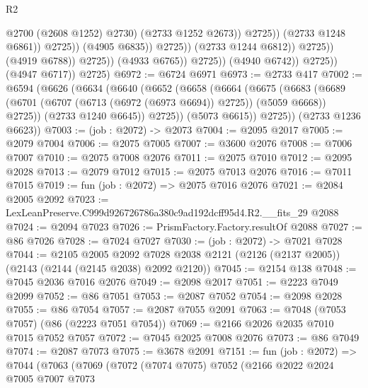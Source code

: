 \begin{lexlean}{R2}
\begin{coremodule}
                                                    @2700
                                                    (@2608 @1252)
                                                    @2730)
                                                  (@2733 @1252 @2673))
                                                @2725))
                                            (@2733 @1248 @6861))
                                          @2725))
                                      (@4905 @6835))
                                    @2725))
                                (@2733 @1244 @6812))
                              @2725))
                          (@4919 @6788))
                        @2725))
                    (@4933 @6765))
                  @2725))
              (@4940 @6742))
            @2725))
        (@4947 @6717))
      @2725)
@6972 := @6724 @6971
@6973 := @2733 @417
@7002 := @6594
    (@6626
      (@6634
        (@6640
          (@6652
            (@6658
              (@6664
                (@6675
                  (@6683
                    (@6689 (@6701 (@6707 (@6713 (@6972 (@6973 @6694)) @2725)) (@5059 @6668)) @2725))
                  (@2733 @1240 @6645))
                @2725))
            (@5073 @6615))
          @2725))
      (@2733 @1236 @6623))
@7003 := (job : @2072) -> @2073
@7004 := @2095 @2017
@7005 := @2079 @7004
@7006 := @2075 @7005
@7007 := @3600 @2076
@7008 := @7006 @7007
@7010 := @2075 @7008 @2076
@7011 := @2075 @7010
@7012 := @2095 @2028
@7013 := @2079 @7012
@7015 := @2075 @7013 @2076
@7016 := @7011 @7015
@7019 := fun (job : @2072) => @2075 @7016 @2076
@7021 := @2084 @2005 @2092
@7023 := LexLeanPreserve.C999d926726786a380c9ad192dcff95d4.R2.__fits_29 @2088
@7024 := @2094 @7023
@7026 := PrismFactory.Factory.resultOf @2088
@7027 := @86 @7026
@7028 := @7024 @7027
@7030 := (job : @2072) -> @7021 @7028
@7044 := @2105
    @2005
    @2092
    @7028
    @2038
    @2121
    (@2126 (@2137 @2005))
    (@2143 (@2144 (@2145 @2038) @2092 @2120))
@7045 := @2154 @138
@7048 := @7045 @2036 @7016 @2076
@7049 := @2098 @2017
@7051 := @2223 @7049 @2099
@7052 := @86 @7051
@7053 := @2087 @7052
@7054 := @2098 @2028
@7055 := @86 @7054
@7057 := @2087 @7055 @2091
@7063 := @7048 (@7053 @7057) (@86 (@2223 @7051 @7054))
@7069 := @2166 @2026 @2035 @7010 @7015 @7052 @7057
@7072 := @7045 @2025 @7008 @2076
@7073 := @86 @7049
@7074 := @2087 @7073
@7075 := @3678 @2091
@7151 := fun (job : @2072) =>
  @7044
    (@7063
      (@7069
        (@7072
          (@7074 @7075)
          @7052
          (@2166
            @2022
            @2024
            @7005
            @7007
            @7073

\end{coremodule}
\end{lexlean}
